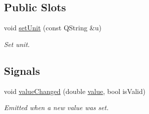 \subsection*{Public Slots}
\begin{DoxyCompactItemize}
\item 
void \hyperlink{classmdt_double_edit_a3eb1b0434235fae23fa3f795fb90066e}{set\-Unit} (const Q\-String \&u)
\begin{DoxyCompactList}\small\item\em Set unit. \end{DoxyCompactList}\end{DoxyCompactItemize}
\subsection*{Signals}
\begin{DoxyCompactItemize}
\item 
void \hyperlink{classmdt_double_edit_a04275f70dcfa22b677841a108dde2561}{value\-Changed} (double \hyperlink{classmdt_double_edit_a6987992984d3cfab5f96467c2b98e511}{value}, bool is\-Valid)
\begin{DoxyCompactList}\small\item\em Emitted when a new value was set. \end{DoxyCompactList}\end{DoxyCompactItemize}
